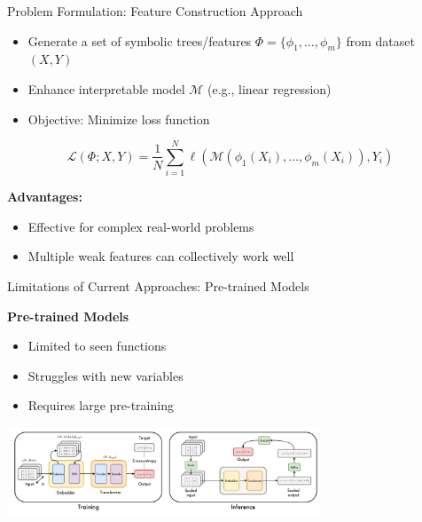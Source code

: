 \documentclass[aspectratio=1610]{beamer}
\begin{document}
    \begin{frame}{Problem Formulation: Feature Construction Approach}
        \begin{itemize}
            \item Generate a set of symbolic trees/features $\Phi = \{\phi_1, \ldots, \phi_m\}$ from dataset $(X, Y)$
            \item Enhance interpretable model $\mathcal{M}$ (e.g., linear regression)
            \item Objective: Minimize loss function
        \end{itemize}

        \begin{equation}
            \mathcal{L}(\Phi; X, Y) = \frac{1}{N} \sum_{i=1}^{N} \ell\left(\mathcal{M}\left(\phi_1(X_i), \ldots, \phi_m(X_i)\right), Y_i\right)
        \end{equation}

        \vspace{0.3cm}
        \textbf{Advantages:}
        \begin{itemize}
            \item Effective for complex real-world problems
            \item Multiple weak features can collectively work well
        \end{itemize}
    \end{frame}


    \begin{frame}{Limitations of Current Approaches: Pre-trained Models}

        \begin{center}
            \textbf{Pre-trained Models}
            \begin{itemize}
                \item Limited to seen functions
                \item Struggles with new variables
                \item Requires large pre-training
            \end{itemize}
            \includegraphics[width=0.7\textwidth]{figs/E2E.png}
        \end{center}
    \end{frame}
\end{document}
